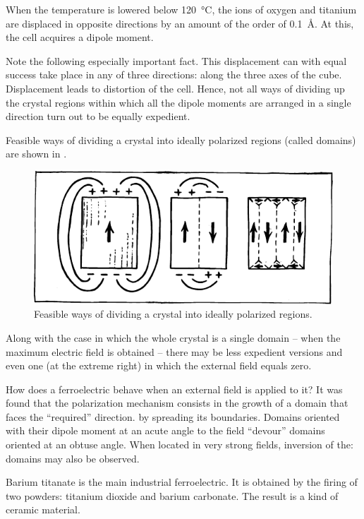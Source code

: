 When the temperature is lowered below \SI{120}{\celsius}, the ions of oxygen and titanium are displaced in opposite directions by an amount of the order of \SI{0.1}{\angstrom}. At this, the cell acquires a dipole moment.

Note the following especially important fact. This displacement can with equal success take place in any of three directions: along the three axes of the cube. Displacement leads to distortion of the cell. Hence, not all ways of dividing up the crystal regions within which all the dipole moments are arranged in a single direction turn out to be equally expedient.

Feasible ways of dividing a crystal into ideally polarized regions (called domains) are shown in .

\begin{figure}[!ht]
\centering
\includegraphics[width=\textwidth]{figures/fig-02-05.pdf}
\caption{Feasible ways of dividing a crystal into ideally polarized regions.}
\label{fig-2.5}
\end{figure}

Along with the case in which the whole crystal is a single domain -- when the maximum electric field is obtained -- there may be less expedient versions and even one (at the extreme right) in which the external field equals zero.

How does a ferroelectric behave when an external field is applied to it? It was found that the polarization mechanism consists in the growth of a domain that faces the ``required'' direction. by spreading its boundaries. Domains oriented with their dipole moment at an acute angle to the field ``devour'' domains oriented at an obtuse angle. When located in very strong fields, inversion of the: domains may also be observed.

Barium titanate is the main industrial ferroelectric. It is obtained by the firing of two powders: titanium dioxide and barium carbonate. The result is a kind of ceramic material.

